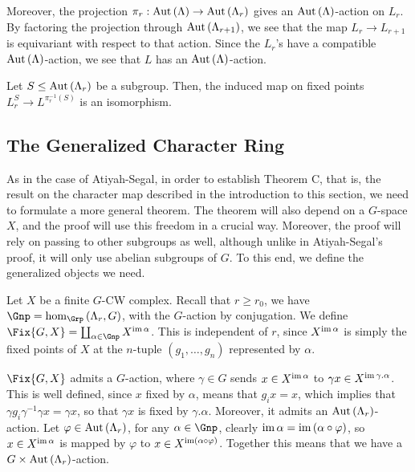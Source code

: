 
Moreover, the projection $\pi_r: \operatorname{Aut}\left(\Lambda\right) \to \operatorname{Aut}\left(\Lambda_r\right)$ gives an $\operatorname{Aut}\left(\Lambda\right)$-action on $L_r$.
By factoring the projection through $\operatorname{Aut}\left(\Lambda_{r+1}\right)$, we see that the map $L_r \to L_{r+1}$ is equivariant with respect to that action.
Since the $L_r$'s have a compatible $\operatorname{Aut}\left(\Lambda\right)$-action, we see that $L$ has an $\operatorname{Aut}\left(\Lambda\right)$-action.

\begin{proposition}
	Let $S \leq \operatorname{Aut}\left(\Lambda_r\right)$ be a subgroup.
	Then, the induced map on fixed points $L_r^S \to L^{\pi_r^{-1}\left(S\right)}$ is an isomorphism.
\end{proposition}




\subsection{The Generalized Character Ring}

As in the case of Atiyah-Segal, in order to establish Theorem C, that is, the result on the character map described in the introduction to this section, we need to formulate a more general theorem.
The theorem will also depend on a $G$-space $X$, and the proof will use this freedom in a crucial way.
Moreover, the proof will rely on passing to other subgroups as well, although unlike in Atiyah-Segal's proof, it will only use abelian subgroups of $G$.
To this end, we define the generalized objects we need.

Let $X$ be a finite $G$-CW complex.
Recall that $r \geq r_0$, we have $\Gnp = \hom_{\Grp}\left(\Lambda_r, G\right)$, with the $G$-action by conjugation.
We define $\Fix{G,X} = \coprod_{\alpha \in \Gnp} X^{\im \alpha}$.
This is independent of $r$, since $X^{\operatorname{im} \alpha}$ is simply the fixed points of $X$ at the $n$-tuple $\left(g_1, \dotsc, g_n\right)$ represented by $\alpha$.

$\Fix{G,X}$ admits a $G$-action, where $\gamma \in G$ sends $x \in X^{\operatorname{im} \alpha}$ to $\gamma x \in X^{\operatorname{im} \gamma.\alpha}$.
This is well defined, since $x$ fixed by $\alpha$, means that $g_i x = x$, which implies that $\gamma g_i \gamma^{-1} \gamma x = \gamma x$, so that $\gamma x$ is fixed by $\gamma. \alpha$.
Moreover, it admits an $\operatorname{Aut}\left(\Lambda_r\right)$-action.
Let $\varphi \in \operatorname{Aut}\left(\Lambda_r\right)$, for any $\alpha \in \Gnp$, clearly $\operatorname{im} \alpha = \operatorname{im} \left(\alpha\circ\varphi\right)$, so $x \in X^{\operatorname{im} \alpha}$ is mapped by $\varphi$ to $x \in X^{\operatorname{im} \left(\alpha\circ\varphi\right)}$.
Together this means that we have a $G \times \operatorname{Aut} \left(\Lambda_r\right)$-action.

